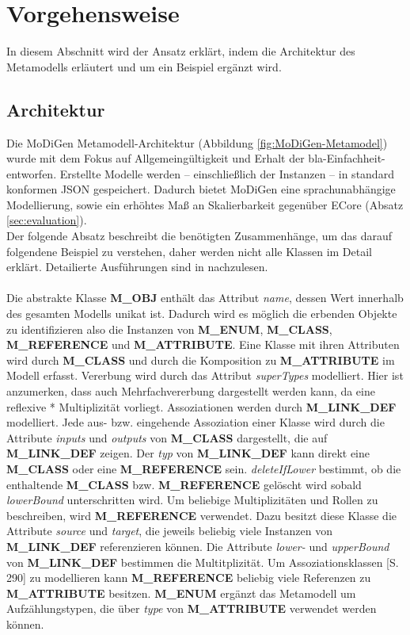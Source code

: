 \section{Vorgehensweise}
In diesem Abschnitt wird der Ansatz erkl\"art, indem die Architektur des Metamodells erl\"autert und um ein Beispiel erg\"anzt wird.

\subsection{Architektur}
Die MoDiGen Metamodell-Architektur (Abbildung \ref{fig:MoDiGen-Metamodel}) wurde mit dem Fokus auf Allgemeingültigkeit und Erhalt der bla-Einfachheit- entworfen. Erstellte Modelle werden -- einschließlich der Instanzen -- in standard konformen JSON gespeichert. Dadurch bietet MoDiGen eine sprachunabhängige Modellierung, sowie ein erhöhtes Maß an Skalierbarkeit gegenüber ECore (Absatz \ref{sec:evaluation}).\\Der folgende Absatz beschreibt die benötigten Zusammenhänge, um das darauf folgendene Beispiel zu verstehen, daher werden nicht alle Klassen im Detail erkl\"art. Detailierte Ausführungen sind in \cite{gerhart2015approach} nachzulesen.\\\\



Die abstrakte Klasse \textbf{M\_OBJ} enth\"alt das Attribut \textit{name}, dessen Wert innerhalb des gesamten Modells unikat ist. Dadurch wird es m\"oglich die erbenden Objekte zu identifizieren also die Instanzen von \textbf{M\_ENUM}, \textbf{M\_CLASS}, \textbf{M\_REFERENCE} und \textbf{M\_ATTRIBUTE}.
Eine Klasse mit ihren Attributen wird durch \textbf{M\_CLASS} und durch die Komposition zu \textbf{M\_ATTRIBUTE} im Modell erfasst. Vererbung wird durch das Attribut \textit{superTypes} modelliert. Hier ist anzumerken, dass auch Mehrfachvererbung dargestellt werden kann, da eine reflexive * Multiplizität vorliegt. 
Assoziationen werden durch \textbf{M\_LINK\_DEF} modelliert. Jede aus- bzw. eingehende Assoziation einer Klasse wird durch die Attribute \textit{inputs} und \textit{outputs} von \textbf{M\_CLASS} dargestellt, die auf \textbf{M\_LINK\_DEF} zeigen. Der \textit{typ} von \textbf{M\_LINK\_DEF} kann direkt eine \textbf{M\_CLASS} oder eine \textbf{M\_REFERENCE} sein. \textit{deleteIfLower} bestimmt, ob die enthaltende \textbf{M\_CLASS} bzw. \textbf{M\_REFERENCE} gel\"oscht wird sobald \textit{lowerBound} unterschritten wird. Um beliebige Multiplizitäten und Rollen zu beschreiben, wird \textbf{M\_REFERENCE} verwendet. Dazu besitzt diese Klasse die Attribute \textit{source} und \textit{target}, die jeweils beliebig viele Instanzen von \textbf{M\_LINK\_DEF} referenzieren können. Die Attribute \textit{lower-} und \textit{upperBound} von \textbf{M\_LINK\_DEF} bestimmen die Multitplizität. Um Assoziationsklassen \cite{larman2005book}[S. 290] zu modellieren kann \textbf{M\_REF\-ER\-ENCE} beliebig viele Referenzen zu \textbf{M\_ATTRIBUTE} besitzen. \textbf{M\_ENUM} erg\"anzt das Metamodell um Aufz\"ahlungstypen, die \"uber \textit{type} von \textbf{M\_ATTRIBUTE} verwendet werden k\"onnen.

